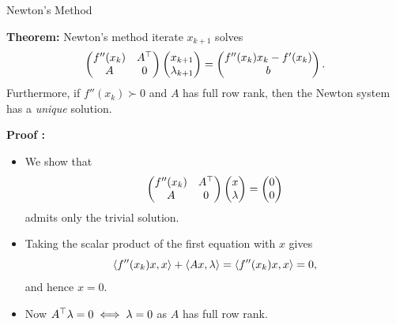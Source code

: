 \documentclass[9pt]{beamer}
\begin{document}
\begin{frame}{Newton's Method}

  
  
  \textbf{Theorem:} Newton's method iterate $ x_{k+1}$ solves
  \[
    \begin{pmatrix}
      f''( x_k) &  A\tpose \\
       A &  0%
    \end{pmatrix}
    \begin{pmatrix}
       x_{k+1}\\
       \lambda_{k+1}
    \end{pmatrix}
    =
    \begin{pmatrix}
      f''( x_k) x_k - f'( x_k)\\
       b
    \end{pmatrix}.
  \]
  Furthermore, if $f''( x_k) \succ 0$ and $A$ has full row rank, then the Newton system has a \emph{unique} solution.

  \vfill

  \textbf{Proof :}
  
  \begin{itemize}
  \item<2-> We show that 
    \[
      \begin{pmatrix}
        f''( x_k) &  A\tpose \\
         A &  0%
      \end{pmatrix}
      \begin{pmatrix}
         x\\
         \lambda
      \end{pmatrix}
      =
      \begin{pmatrix}
         0\\
         0
      \end{pmatrix}
    \]
    admits only the trivial solution.
  \item<3-> Taking the scalar product of the first equation with $ x$ gives
    \[
       \left<f''(x_k) x, x\right> + \left<Ax, \lambda\right> = \left<f''(x_k) x, x\right> = 0,
    \]
    and hence $ x= 0$.
  \item<4-> Now $A^\top \lambda = 0 \iff \lambda = 0$ as $ A$ has full row rank.
  \end{itemize}
  
\end{frame}
\end{document}
